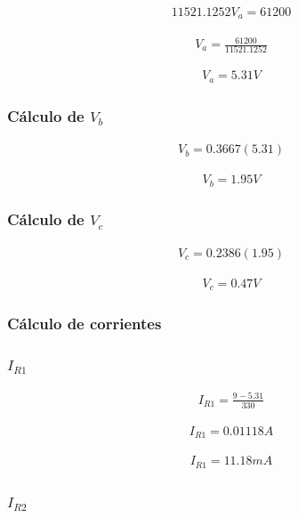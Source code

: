 \documentclass[conference]{IEEEtran}
\begin{document}
\begin{align*}
11521.1252V_a=61200
\end{align*}

\begin{align*}
V_a=\frac{61200}{11521.1252}
\end{align*}

\begin{align*}
V_a=5.31V
\end{align*}

\subsubsection{Cálculo de $V_b$}

\begin{align*}
V_b=0.3667(5.31)
\end{align*}

\begin{align*}
V_b=1.95V
\end{align*}

\subsubsection{Cálculo de $V_c$}

\begin{align*}
V_c=0.2386(1.95)
\end{align*}

\begin{align*}
V_c=0.47V
\end{align*}

\subsubsection{Cálculo de corrientes}

\subsubsection{$I_{R1}$}

\begin{align*}
I_{R1}=\frac{9-5.31}{330}
\end{align*}

\begin{align*}
I_{R1}=0.01118A
\end{align*}

\begin{align*}
I_{R1}=11.18mA
\end{align*}

\subsubsection{$I_{R2}$}
\end{document}
